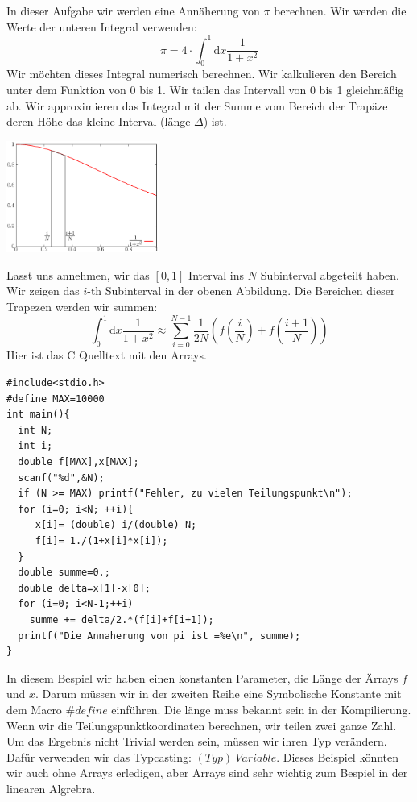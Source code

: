 \documentclass{article}[12pt]
\newenvironment{myexampleprogram}[1]{%
    \tcolorbox[beamer,%
    noparskip,breakable,
    colback=White,colframe=Goldenrod,%
    colbacklower=Yellow!75!White,%
    title=#1]}%
    {\endtcolorbox}
\begin{document}
\begin{myexampleprogram}{ Programme: \texttt{Annäherung von $\pi$}}
In dieser Aufgabe wir werden eine Annäherung von $\pi$ berechnen. 
Wir werden die Werte der unteren Integral verwenden:
\begin{equation}
\pi=4\cdot \int_{0}^{1} \mathrm{d}x \dfrac{1}{1+x^2}
\end{equation}
Wir möchten dieses Integral numerisch berechnen. Wir kalkulieren den Bereich unter
dem Funktion von 0 bis 1. Wir tailen das Intervall von 0 bis 1 gleichmäßig ab. Wir 
approximieren das Integral mit der Summe vom Bereich der Trapäze deren 
Höhe das kleine Interval (länge $\Delta$) ist.
\vspace{-2cm}
\begin{center}
\includegraphics[width=5cm]{trapez1.ps}
\end{center}
\vspace{-2.5cm}
Lasst uns annehmen, wir das $[0,1]$ Interval ins $N$ Subinterval abgeteilt haben. Wir zeigen
das $i$-th Subinterval in der obenen Abbildung. Die Bereichen dieser Trapezen werden
wir summen:
\begin{equation}
 \int_{0}^{1} \mathrm{d}x \dfrac{1}{1+x^2}\approx \sum_{i=0}^{N-1}\frac{1}{2N}(f(\frac{i}{N})+f(\frac{i+1}{N}))
\end{equation}
Hier ist das C Quelltext mit den Arrays.
\begin{lstlisting}
#include<stdio.h>
#define MAX=10000
int main(){
  int N;
  int i;
  double f[MAX],x[MAX];
  scanf("%d",&N);
  if (N >= MAX) printf("Fehler, zu vielen Teilungspunkt\n");
  for (i=0; i<N; ++i){
     x[i]= (double) i/(double) N;
     f[i]= 1./(1+x[i]*x[i]);
  }
  double summe=0.;
  double delta=x[1]-x[0];
  for (i=0; i<N-1;++i)
    summe += delta/2.*(f[i]+f[i+1]);
  printf("Die Annaherung von pi ist =%e\n", summe);
}
\end{lstlisting}
In diesem Bespiel wir haben einen konstanten Parameter, die Länge der Ärrays $f$ und $x$.
Darum müssen wir in der zweiten Reihe eine Symbolische Konstante mit dem Macro $\#define$ einführen.
Die länge muss bekannt sein in der Kompilierung. Wenn wir die Teilungspunktkoordinaten berechnen, wir 
teilen zwei ganze Zahl. Um das Ergebnis nicht Trivial werden sein, müssen wir ihren Typ verändern. Dafür 
verwenden wir das Typcasting: $(Typ)~Variable$. Dieses Beispiel könnten wir auch ohne Arrays erledigen, 
aber Arrays sind sehr wichtig zum Bespiel in der linearen Algrebra.
\end{myexampleprogram}
\end{document}
